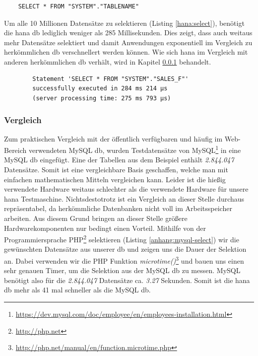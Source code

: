 \begin{lstlisting}
	SELECT * FROM "SYSTEM"."TABLENAME"
\end{lstlisting}

Um alle 10 Millionen Datensätze zu selektieren (Listing \ref{hana:select}), benötigt die \gls{hana} \gls{db} lediglich weniger als 285 Millisekunden. Dies zeigt, dass auch weitaus mehr Datensätze selektiert und damit Anwendungen exponentiell im Vergleich zu herkömmlichen \gls{db} verschnellert werden können. Wie sich \gls{hana} im Vergleich mit anderen herkömmlichen \gls{db} verhält, wird in Kapitel \ref{sec:db-hana-vgl} behandelt.

\begin{center}
	\begin{verbatim}
		Statement 'SELECT * FROM "SYSTEM"."SALES_F"' 
		successfully executed in 284 ms 214 µs  
		(server processing time: 275 ms 793 µs)
	\end{verbatim}
\end{center}

\subsubsection{Vergleich}
\label{sec:db-hana-vgl}
Zum praktischen Vergleich mit der öffentlich verfügbaren und häufig im Web-Bereich verwendeten MySQL \gls{db}, wurden Testdatensätze von MySQL\footnote{\url{https://dev.mysql.com/doc/employee/en/employees-installation.html}} in eine MySQL \gls{db} eingefügt. Eine der Tabellen aus dem Beispiel enthält \emph{2.844.047} Datensätze. Somit ist eine vergleichbare Basis geschaffen, welche man mit einfachen mathematischen Mitteln vergleichen kann. Leider ist die hießig verwendete Hardware weitaus schlechter als die verwendete Hardware für unsere \gls{hana} Testmaschine. Nichtsdestotrotz ist ein Vergleich an dieser Stelle durchaus repräsentabel, da herkömmliche Datenbanken nicht voll im Arbeitsspeicher arbeiten. Aus diesem Grund bringen an dieser Stelle größere Hardwarekomponenten nur bedingt einen Vorteil.
Mithilfe von der Programmiersprache PHP\footnote{\url{http://php.net}} selektieren (Listing \ref{anhang:mysql-select}) wir die gewünschten Datensätze aus unserer \gls{db} und zeigen uns die Dauer der Selektion an. Dabei verwenden wir die PHP Funktion \emph{microtime()}\footnote{\url{http://php.net/manual/en/function.microtime.php}} und bauen uns einen sehr genauen Timer, um die Selektion aus der MySQL \gls{db} zu messen.
MySQL benötigt also für die \emph{2.844.047} Datensätze ca. \emph{3.27} Sekunden. Somit ist die \gls{hana} \gls{db} mehr als 41 mal schneller als die MySQL \gls{db}. 

